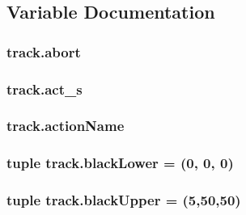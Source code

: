\subsection{Variable Documentation}
\subsubsection[{\texorpdfstring{abort}{abort}}]{\setlength{\rightskip}{0pt plus 5cm}track.\+abort}\hypertarget{namespacetrack_a24e6d51863a39321aae96a7464685240}{}\label{namespacetrack_a24e6d51863a39321aae96a7464685240}
\subsubsection[{\texorpdfstring{act\+\_\+s}{act_s}}]{\setlength{\rightskip}{0pt plus 5cm}track.\+act\+\_\+s}\hypertarget{namespacetrack_a9abe825f904267585ec9e11e68ef54e5}{}\label{namespacetrack_a9abe825f904267585ec9e11e68ef54e5}
\subsubsection[{\texorpdfstring{action\+Name}{actionName}}]{\setlength{\rightskip}{0pt plus 5cm}track.\+action\+Name}\hypertarget{namespacetrack_a01cd8e88d322162de1f8f859c21debf9}{}\label{namespacetrack_a01cd8e88d322162de1f8f859c21debf9}
\subsubsection[{\texorpdfstring{black\+Lower}{blackLower}}]{\setlength{\rightskip}{0pt plus 5cm}tuple track.\+black\+Lower = (0, 0, 0)}\hypertarget{namespacetrack_a4ee13246ec46c21cfdcfee1b16f7eec4}{}\label{namespacetrack_a4ee13246ec46c21cfdcfee1b16f7eec4}
\subsubsection[{\texorpdfstring{black\+Upper}{blackUpper}}]{\setlength{\rightskip}{0pt plus 5cm}tuple track.\+black\+Upper = (5,50,50)}\hypertarget{namespacetrack_a7c7120c727a2836315550f0091cd7277}{}\label{namespacetrack_a7c7120c727a2836315550f0091cd7277}
